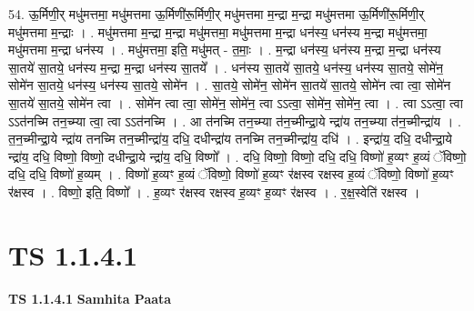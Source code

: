 \documentclass[17pt]{extarticle}
\begin{document}
54. ऊ॒र्मिणी॒र् मधु॑मत्तमा॒ मधु॑मत्तमा ऊ॒र्मिणी॑रू॒र्मिणी॒र् मधु॑मत्तमा म॒न्द्रा म॒न्द्रा मधु॑मत्तमा ऊ॒र्मिणी॑रू॒र्मिणी॒र् मधु॑मत्तमा म॒न्द्राः । . मधु॑मत्तमा म॒न्द्रा म॒न्द्रा मधु॑मत्तमा॒ मधु॑मत्तमा म॒न्द्रा धन॑स्य॒ धन॑स्य म॒न्द्रा मधु॑मत्तमा॒ मधु॑मत्तमा म॒न्द्रा धन॑स्य । . मधु॑मत्तमा॒ इति॒ मधु॑मत् - त॒माः॒ । . म॒न्द्रा धन॑स्य॒ धन॑स्य म॒न्द्रा म॒न्द्रा धन॑स्य सा॒तये॑ सा॒तये॒ धन॑स्य म॒न्द्रा म॒न्द्रा धन॑स्य सा॒तये᳚ । . धन॑स्य सा॒तये॑ सा॒तये॒ धन॑स्य॒ धन॑स्य सा॒तये॒ सोमे॑न॒ सोमे॑न सा॒तये॒ धन॑स्य॒ धन॑स्य सा॒तये॒ सोमे॑न । . सा॒तये॒ सोमे॑न॒ सोमे॑न सा॒तये॑ सा॒तये॒ सोमे॑न त्वा त्वा॒ सोमे॑न सा॒तये॑ सा॒तये॒ सोमे॑न त्वा । . सोमे॑न त्वा त्वा॒ सोमे॑न॒ सोमे॑न॒ त्वा ऽऽत्वा॒ सोमे॑न॒ सोमे॑न॒ त्वा । . त्वा ऽऽत्वा॒ त्वा ऽऽत॑नच्मि तन॒च्म्या त्वा॒ त्वा ऽऽत॑नच्मि । . आ त॑नच्मि तन॒च्म्या त॑न॒च्मीन्द्रा॒ये न्द्रा॑य तन॒च्म्या त॑न॒च्मीन्द्रा॑य । . त॒न॒च्मीन्द्रा॒ये न्द्रा॑य तनच्मि तन॒च्मीन्द्रा॑य॒ दधि॒ दधीन्द्रा॑य तनच्मि तन॒च्मीन्द्रा॑य॒ दधि॑ । . इन्द्रा॑य॒ दधि॒ दधीन्द्रा॒ये न्द्रा॑य॒ दधि॒ विष्णो॒ विष्णो॒ दधीन्द्रा॒ये न्द्रा॑य॒ दधि॒ विष्णो᳚ । . दधि॒ विष्णो॒ विष्णो॒ दधि॒ दधि॒ विष्णो॑ ह॒व्यꣳ ह॒व्यं ॅविष्णो॒ दधि॒ दधि॒ विष्णो॑ ह॒व्यम् । . विष्णो॑ ह॒व्यꣳ ह॒व्यं ॅविष्णो॒ विष्णो॑ ह॒व्यꣳ र॑क्षस्व रक्षस्व ह॒व्यं ॅविष्णो॒ विष्णो॑ ह॒व्यꣳ र॑क्षस्व । . विष्णो॒ इति॒ विष्णो᳚ । . ह॒व्यꣳ र॑क्षस्व रक्षस्व ह॒व्यꣳ ह॒व्यꣳ र॑क्षस्व । . र॒क्ष॒स्वेति॑ रक्षस्व । \newline
\pagebreak
{}
\section*{ TS 1.1.4.1 }

\textbf{TS 1.1.4.1 } \newline
\textbf{Samhita Paata} \newline
\end{document}
